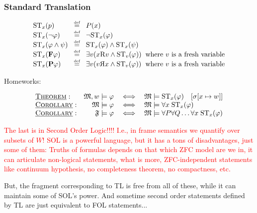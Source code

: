 \documentclass[xcolor=x11names]{beamer}
\newcommand{\cemph}[1]{\textcolor{red}{#1}}
\newcommand{\FD}{\mathbf F}
\newcommand{\PD}{\mathbf P}
\newcommand{\dzsa}[1]{\textsc{\underline{#1}}:}
\newcommand{\defegy}[1][.1]{\hspace{#1cm}\overset{\textup{\tiny def}}{=}\hspace{#1cm}}
\newenvironment{tomb}[2][.1]{\arraycolsep=#1cm\begin{array}{#2}}{\end{array}}
\begin{document}
\begin{frame}
	\frametitle{Standard Translation}
\footnotesize
\[\begin{tomb}{lcll}
   \mathrm{ST}_{x} (p) &\defegy& P(x)
\\ \mathrm{ST}_{x} (\lnot \varphi) &\defegy& \lnot\mathrm{ST}_{x} (\varphi)
\\ \mathrm{ST}_{x} (\varphi \land  \psi) &\defegy& \mathrm{ST}_{x} (\varphi) \land \mathrm{ST}_{x} (\psi)
\\ \mathrm{ST}_{x} (\FD\varphi ) &\defegy& \exists v (x\mathrm Rv \land \mathrm{ST}_{v} (\varphi)) &\textup{where $v$ is a fresh variable}
\\ \mathrm{ST}_{x} (\PD\varphi ) &\defegy& \exists v (v\reflectbox R x \land \mathrm{ST}_{v} (\varphi)) &\textup{where $v$ is a fresh variable}
\end{tomb}\]

Homeworks:

\[\begin{array}{lrcl}
   \dzsa{Theorem} &\mathfrak M, w \models \varphi &\iff & \mathfrak M \models \mathrm{ST}_x(\varphi) \quad [\sigma[x\mapsto w ]]
\\ \dzsa{Corollary} & \mathfrak M\models \varphi &\iff & \mathfrak M \models \forall x\; \mathrm{ST}_x(\varphi)
\\ \dzsa{Corollary} & \mathfrak F\models \varphi &\iff & \mathfrak M \models \forall P \forall Q \dots\forall x\; \mathrm{ST}_x(\varphi)
\end{array}\]
{\tiny \cemph{The last is in Second Order Logic!!!! I.e., in frame semantics we quantify over subsets of $W$! SOL is a powerful language, but it has a tons of disadvantages, just some of them: Truths of formulas depends on that which ZFC model are we in, it can articulate non-logical statements, what is more, ZFC-independent statements like continuum hypothesis, no completeness theorem, no compactness, etc.}

But, the fragment corresponding to TL is free from all of these, while it can maintain some of SOL's power. And sometime second order statements defined by TL are just equivalent to FOL statements...}
\end{frame}
\end{document}
